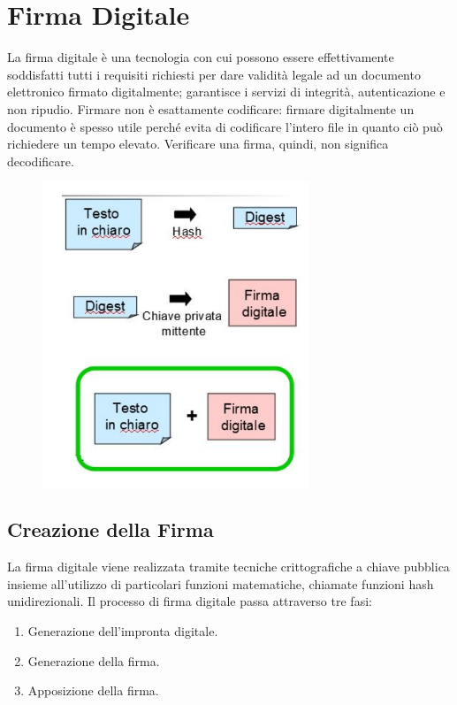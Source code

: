 \section{Firma Digitale}

La firma digitale è una tecnologia con cui possono essere
effettivamente soddisfatti tutti i requisiti richiesti per dare validità
legale ad un documento elettronico firmato digitalmente;
garantisce i servizi di integrità, autenticazione e non ripudio.
Firmare non è esattamente codificare: firmare digitalmente un documento è spesso
utile perché evita di
codificare l'intero file in quanto ciò può richiedere un
tempo elevato. Verificare una firma, quindi, non significa
decodificare.

\begin{figure}[H]
    \centering
    \includegraphics[width=8cm, keepaspectratio]{capitoli/crittografia/imgs/firmad.png}
\end{figure}

\subsection{Creazione della Firma}

La firma digitale viene realizzata tramite tecniche
crittografiche a
chiave pubblica insieme all'utilizzo di particolari
funzioni matematiche, chiamate funzioni hash
unidirezionali. Il processo di firma digitale passa
attraverso tre fasi:

\begin{enumerate}
    \item Generazione dell'impronta digitale.
    \item Generazione della firma.
    \item Apposizione della firma.
\end{enumerate}

